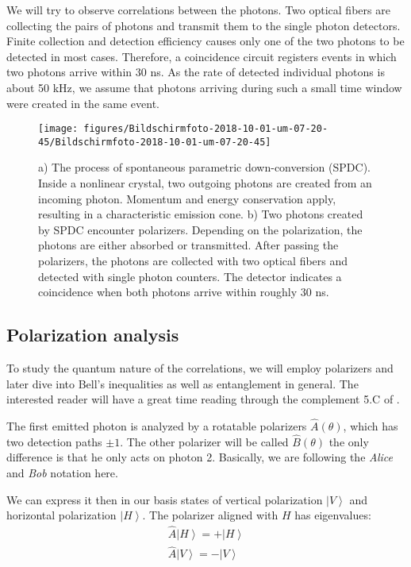 \documentclass[10pt]{article}
\let\cite\citep
\providecommand\citep{\cite}
\newcommand{\ket}[1]{\ensuremath{\left|#1\right\rangle}}
\begin{document}
We will try to observe correlations between the photons. Two optical fibers are collecting the pairs of photons and transmit them to the single photon detectors. Finite collection and detection efficiency causes only one of the two photons to be detected in most cases. Therefore, a coincidence circuit registers events in which two photons arrive within \num{30} \si{\nano \second}. As the rate of detected individual photons is about \num{50} \si{\kilo \hertz}, we assume that photons arriving during such a small time window were created in the same event.
\begin{figure}[h!]
\begin{center}
\texttt{[image: figures/Bildschirmfoto-2018-10-01-um-07-20-45/Bildschirmfoto-2018-10-01-um-07-20-45]}
\caption{{a) The process of spontaneous parametric down-conversion (SPDC). Inside
a nonlinear crystal, two outgoing photons are created from an incoming
photon. Momentum and energy conservation apply, resulting in a
characteristic emission cone. b) Two photons created by SPDC encounter
polarizers. Depending on the polarization, the photons are either
absorbed or transmitted. After passing the polarizers, the photons are
collected with two optical fibers and detected with single photon
counters. The detector indicates a coincidence when both photons arrive
within roughly 30 ns.
{\label{888919}}%
}}
\end{center}
\end{figure}







\subsection{Polarization analysis}

To study the quantum nature of the correlations, we will employ polarizers and later dive into Bell's inequalities as well as entanglement in general. The interested reader will have a great time reading through the complement 5.C of \cite{grynberg}.

The first emitted photon is analyzed by a rotatable polarizers $\hat{A}(\theta)$, which has two detection paths $\pm1$. The other polarizer will be called $\hat{B}(\theta)$ the only difference is that he only acts on photon 2. Basically, we are following the \textit{Alice} and \textit{Bob} notation here.

We can express it then in our basis states of vertical polarization $\ket{V}$ and horizontal polarization $\ket{H}$. The polarizer aligned with $H$ has eigenvalues:
\begin{align}
\hat{A} \ket{H}= +\ket{H}\\
\hat{A} \ket{V}= -\ket{V}
\end{align}
\end{document}
